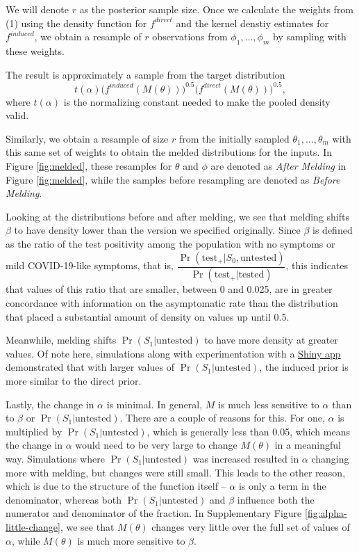 \documentclass[12pt,twoside]{smiththesis}
\begin{document}
We will denote \(r\) as the posterior sample size. Once we calculate the weights from (1) using the density function for \(f^{direct}\) and the kernel denstiy estimates for \(f^{induced}\), we obtain a resample of \(r\) observations from \(\phi_1,\dots,\phi_m\) by sampling with these weights.

The result is approximately a sample from the target distribution \[t(\alpha) \Big( f^{induced}(M(\theta)) \Big)^{0.5} \Big( f^{direct} (M(\theta)) \Big)^{0.5},\] where \(t(\alpha)\) is the normalizing constant needed to make the pooled density valid.

Similarly, we obtain a resample of size \(r\) from the initially sampled \(\theta_1, \dots, \theta_m\) with this same set of weights to obtain the melded distributions for the inputs. In Figure \ref{fig:melded}, these resamples for \(\theta\) and \(\phi\) are denoted as \emph{After Melding} in Figure \ref{fig:melded}, while the samples before resampling are denoted as \emph{Before Melding}.

Looking at the distributions before and after melding, we see that melding shifts \(\beta\) to have density lower than the version we specified originally. Since \(\beta\) is defined as the ratio of the test positivity among the population with no symptoms or mild COVID-19-like symptoms, that is, \(\dfrac{\Pr(\text{test}_+|S_0,\text{untested})}{\Pr(\text{test}_+|\text{tested})}\), this indicates that values of this ratio that are smaller, between 0 and 0.025, are in greater concordance with information on the asymptomatic rate than the distribution that placed a substantial amount of density on values up until 0.5.

Meanwhile, melding shifts \(\Pr(S_1|\text{untested})\) to have more density at greater values. Of note here, simulations along with experimentation with a \href{https://q-w-a.shinyapps.io/bayesian_melding_priors/}{Shiny app} demonstrated that with larger values of \(\Pr(S_1|\text{untested})\), the induced prior is more similar to the direct prior.

Lastly, the change in \(\alpha\) is minimal. In general, \(M\) is much less sensitive to \(\alpha\) than to \(\beta\) or \(\Pr(S_1|\text{untested})\). There are a couple of reasons for this. For one, \(\alpha\) is multiplied by \(\Pr(S_1|\text{untested})\), which is generally less than 0.05, which means the change in \(\alpha\) would need to be very large to change \(M(\theta)\) in a meaningful way. Simulations where \(\Pr(S_1|\text{untested})\) was increased resulted in \(\alpha\) changing more with melding, but changes were still small. This leads to the other reason, which is due to the structure of the function itself -- \(\alpha\) is only a term in the denominator, whereas both \(\Pr(S_1|\text{untested})\) and \(\beta\) influence both the numerator and denominator of the fraction. In Supplementary Figure \ref{fig:alpha-little-change}, we see that \(M(\theta)\) changes very little over the full set of values of \(\alpha\), while \(M(\theta)\) is much more sensitive to \(\beta\).
\end{document}
